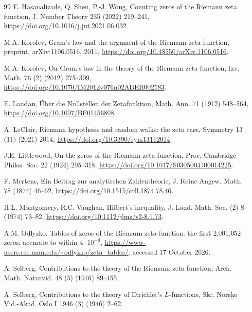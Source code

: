 \documentclass[preprint,12pt]{elsarticle}
\numberwithin{equation}{section}
\theoremstyle{plain}
\theoremstyle{definition}
\theoremstyle{remark}
\begin{document}
\begin{thebibliography}{99}
E. Hasanalizade, Q. Shen, P.-J. Wong, Counting zeros of the Riemann zeta function, J. Number Theory 235 (2022) 219--241, \href{https://doi.org/10.1016/j.jnt.2021.06.032}{https://doi.org/10.1016/j.jnt.2021.06.032}.

M.A. Korolev, Gram's law and the argument of the Riemann zeta function, preprint, arXiv:1106.0516, 2011, \href{https://doi.org/10.48550/arXiv.1106.0516}{https://doi.org/10.48550/arXiv.1106.0516}.

M.A. Korolev, On Gram's law in the theory of the Riemann zeta function, Izv. Math. 76 (2) (2012) 275--309, \href{https://doi.org/10.1070/IM2012v076n02ABEH002583}{https://doi.org/10.1070/IM2012v076n02ABEH002583}.

E. Landau, \"Uber die Nullstellen der Zetafunktion, Math. Ann. 71 (1912) 548--564, \href{https://doi.org/10.1007/BF01456808}{https://doi.org/10.1007/BF01456808}.

A. LeClair, Riemann hypothesis and random walks: the zeta case, Symmetry 13 (11) (2021) 2014, \href{https://doi.org/10.3390/sym13112014}{https://doi.org/10.3390/sym13112014}.

J.E. Littlewood, On the zeros of the Riemann zeta-function, Proc. Cambridge Philos. Soc. 22 (1924) 295--318, \href{https://doi.org/10.1017/S0305004100014225}{https://doi.org/10.1017/S0305004100014225}.

F. Mertens, Ein Beitrag zur analytischen Zahlentheorie, J. Reine Angew. Math. 78 (1874) 46--62, \href{https://doi.org/10.1515/crll.1874.78.46}{https://doi.org/10.1515/crll.1874.78.46}.

H.L. Montgomery, R.C. Vaughan, Hilbert's inequality, J. Lond. Math. Soc. (2) 8 (1974) 73--82, \href{https://doi.org/10.1112/jlms/s2-8.1.73}{https://doi.org/10.1112/jlms/s2-8.1.73}.

A.M. Odlyzko, Tables of zeros of the Riemann zeta function: the first 2,001,052 zeros, accurate to within $4\cdot10^{-9}$, \url{https://www-users.cse.umn.edu/~odlyzko/zeta_tables/}, accessed 17 October 2026.

A. Selberg, Contributions to the theory of the Riemann zeta-function, Arch. Math. Naturvid. 48 (5) (1946) 89--155.

A. Selberg, Contributions to the theory of Dirichlet's $L$-functions, Skr. Norske Vid.-Akad. Oslo I 1946 (3) (1946) 2--62.


\end{thebibliography}
\end{document}
